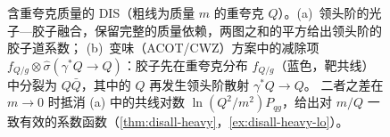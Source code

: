 \begin{figure}[htbp]
\caption{含重夸克质量的 DIS（粗线为质量 $m$ 的重夸克 $Q$）。(a)~领头阶的光子—胶子融合，保留完整的质量依赖，两图之和的平方给出领头阶的胶子道系数；
(b)~变味（ACOT/CWZ）方案中的减除项 ${f_{Q/g}\otimes\hat\sigma(\gamma^*Q\to Q)}$：胶子先在重夸克分布 $f_{Q/g}$（蓝色，靶共线）中分裂为 $Q\bar Q$，其中的 $Q$ 再发生领头阶散射 $\gamma^*Q\to Q$。
二者之差在 $m\to0$ 时抵消 (a) 中的共线对数 $\ln(Q^2/m^2)P_{qg}$，给出对 $m/Q$ 一致有效的系数函数（\cref{thm:disall-heavy}，\cref{ex:disall-heavy-lo}）。}
\label{fig:disall-heavy}
\end{figure}


